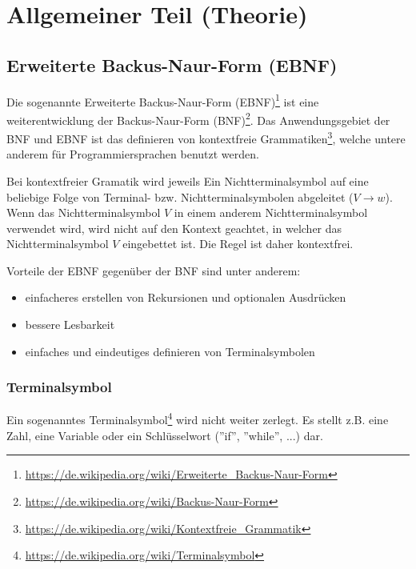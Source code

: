 

\section{Allgemeiner Teil (Theorie)}

\subsection{Erweiterte Backus-Naur-Form (EBNF)}

Die sogenannte Erweiterte Backus-Naur-Form (EBNF)\footnote{\url{https://de.wikipedia.org/wiki/Erweiterte_Backus-Naur-Form}} ist eine weiterentwicklung der Backus-Naur-Form (BNF)\footnote{\url{https://de.wikipedia.org/wiki/Backus-Naur-Form}}. Das Anwendungsgebiet der BNF und EBNF ist das definieren von  kontextfreie Grammatiken\footnote{\url{https://de.wikipedia.org/wiki/Kontextfreie_Grammatik}}, welche untere anderem f\"ur Programmiersprachen benutzt werden.

Bei kontextfreier Gramatik wird jeweils Ein Nichtterminalsymbol auf eine beliebige Folge von Terminal- bzw. Nichtterminalsymbolen abgeleitet ($V \rightarrow w$). Wenn das Nichtterminalsymbol $V$ in einem anderem Nichtterminalsymbol verwendet wird, wird nicht auf den Kontext geachtet, in welcher das Nichtterminalsymbol $V$ eingebettet ist. Die Regel ist daher kontextfrei.

Vorteile der EBNF gegen\"uber der BNF sind unter anderem:

\begin{itemize}
  \item einfacheres erstellen von Rekursionen und optionalen Ausdr\"ucken
  \item bessere Lesbarkeit
  \item einfaches und eindeutiges definieren von Terminalsymbolen
\end{itemize}

\newpage

\subsubsection{Terminalsymbol}

Ein sogenanntes Terminalsymbol\footnote{\url{https://de.wikipedia.org/wiki/Terminalsymbol}} wird nicht weiter zerlegt. Es stellt z.B. eine Zahl, eine Variable oder ein Schlüsselwort (''if'', ''while'', ...) dar.

